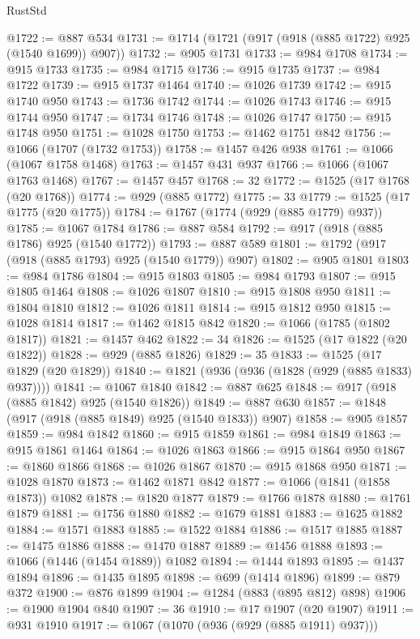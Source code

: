 \begin{lexlean}{RustStd}
\begin{coremodule}
@1722 := @887 @534
@1731 := @1714 (@1721 (@917 (@918 (@885 @1722) @925 (@1540 @1699)) @907))
@1732 := @905 @1731
@1733 := @984 @1708
@1734 := @915 @1733
@1735 := @984 @1715
@1736 := @915 @1735
@1737 := @984 @1722
@1739 := @915 @1737 @1464
@1740 := @1026 @1739
@1742 := @915 @1740 @950
@1743 := @1736 @1742
@1744 := @1026 @1743
@1746 := @915 @1744 @950
@1747 := @1734 @1746
@1748 := @1026 @1747
@1750 := @915 @1748 @950
@1751 := @1028 @1750
@1753 := @1462 @1751 @842
@1756 := @1066 (@1707 (@1732 @1753))
@1758 := @1457 @426 @938
@1761 := @1066 (@1067 @1758 @1468)
@1763 := @1457 @431 @937
@1766 := @1066 (@1067 @1763 @1468)
@1767 := @1457 @457
@1768 := 32
@1772 := @1525 (@17 @1768 (@20 @1768))
@1774 := @929 (@885 @1772)
@1775 := 33
@1779 := @1525 (@17 @1775 (@20 @1775))
@1784 := @1767 (@1774 (@929 (@885 @1779) @937))
@1785 := @1067 @1784
@1786 := @887 @584
@1792 := @917 (@918 (@885 @1786) @925 (@1540 @1772))
@1793 := @887 @589
@1801 := @1792 (@917 (@918 (@885 @1793) @925 (@1540 @1779)) @907)
@1802 := @905 @1801
@1803 := @984 @1786
@1804 := @915 @1803
@1805 := @984 @1793
@1807 := @915 @1805 @1464
@1808 := @1026 @1807
@1810 := @915 @1808 @950
@1811 := @1804 @1810
@1812 := @1026 @1811
@1814 := @915 @1812 @950
@1815 := @1028 @1814
@1817 := @1462 @1815 @842
@1820 := @1066 (@1785 (@1802 @1817))
@1821 := @1457 @462
@1822 := 34
@1826 := @1525 (@17 @1822 (@20 @1822))
@1828 := @929 (@885 @1826)
@1829 := 35
@1833 := @1525 (@17 @1829 (@20 @1829))
@1840 := @1821 (@936 (@936 (@1828 (@929 (@885 @1833) @937))))
@1841 := @1067 @1840
@1842 := @887 @625
@1848 := @917 (@918 (@885 @1842) @925 (@1540 @1826))
@1849 := @887 @630
@1857 := @1848 (@917 (@918 (@885 @1849) @925 (@1540 @1833)) @907)
@1858 := @905 @1857
@1859 := @984 @1842
@1860 := @915 @1859
@1861 := @984 @1849
@1863 := @915 @1861 @1464
@1864 := @1026 @1863
@1866 := @915 @1864 @950
@1867 := @1860 @1866
@1868 := @1026 @1867
@1870 := @915 @1868 @950
@1871 := @1028 @1870
@1873 := @1462 @1871 @842
@1877 := @1066 (@1841 (@1858 @1873)) @1082
@1878 := @1820 @1877
@1879 := @1766 @1878
@1880 := @1761 @1879
@1881 := @1756 @1880
@1882 := @1679 @1881
@1883 := @1625 @1882
@1884 := @1571 @1883
@1885 := @1522 @1884
@1886 := @1517 @1885
@1887 := @1475 @1886
@1888 := @1470 @1887
@1889 := @1456 @1888
@1893 := @1066 (@1446 (@1454 @1889)) @1082
@1894 := @1444 @1893
@1895 := @1437 @1894
@1896 := @1435 @1895
@1898 := @699 (@1414 @1896)
@1899 := @879 @372
@1900 := @876 @1899
@1904 := @1284 (@883 (@895 @812) @898)
@1906 := @1900 @1904 @840
@1907 := 36
@1910 := @17 @1907 (@20 @1907)
@1911 := @931 @1910
@1917 := @1067 (@1070 (@936 (@929 (@885 @1911) @937)))

\end{coremodule}
\end{lexlean}
